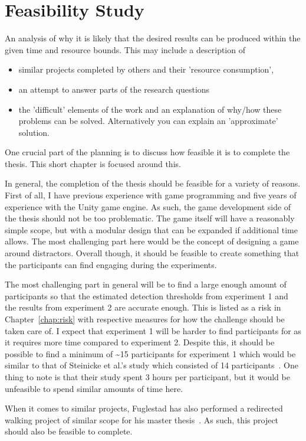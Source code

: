\chapter{Feasibility Study}
An analysis of why it is likely that the desired
results can be produced within the given time and
resource bounds.  This may include a description of
\begin{itemize}
\item similar projects completed by others and their 'resource consumption',
\item an attempt to answer parts of the research questions
\item the 'difficult' elements of the work and an explanation of why/how these problems can be solved.  
Alternatively you can explain an 'approximate' solution.
\end{itemize}
\fi

One crucial part of the planning is to discuss how feasible it is to complete the thesis. This short chapter is focused around this.


In general, the completion of the thesis should be feasible for a variety of reasons. First of all, I have previous experience with game programming and five years of experience with the Unity game engine. As such, the game development side of the thesis should not be too problematic. The game itself will have a reasonably simple scope, but with a modular design that can be expanded if additional time allows. The most challenging part here would be the concept of designing a game around distractors. Overall though, it should be feasible to create something that the participants can find engaging during the experiments.

The most challenging part in general will be to find a large enough amount of participants so that the estimated detection thresholds from experiment 1 and the results from experiment 2 are accurate enough. This is listed as a risk in Chapter~\ref{chap:risk} with respective measures for how the challenge should be taken care of. I expect that experiment 1 will be harder to find participants for as it requires more time compared to experiment 2. Despite this, it should be possible to find a minimum of \textasciitilde 15 participants for experiment 1 which would be similar to that of Steinicke et al.'s study which consisted of 14 participants~\cite{5072212}. One thing to note is that their study spent 3 hours per participant, but it would be unfeasible to spend similar amounts of time here. 

When it comes to similar projects, Fuglestad has also performed a redirected walking project of similar scope for his master thesis~\cite{fuglestad2018redirected}. As such, this project should also be feasible to complete.